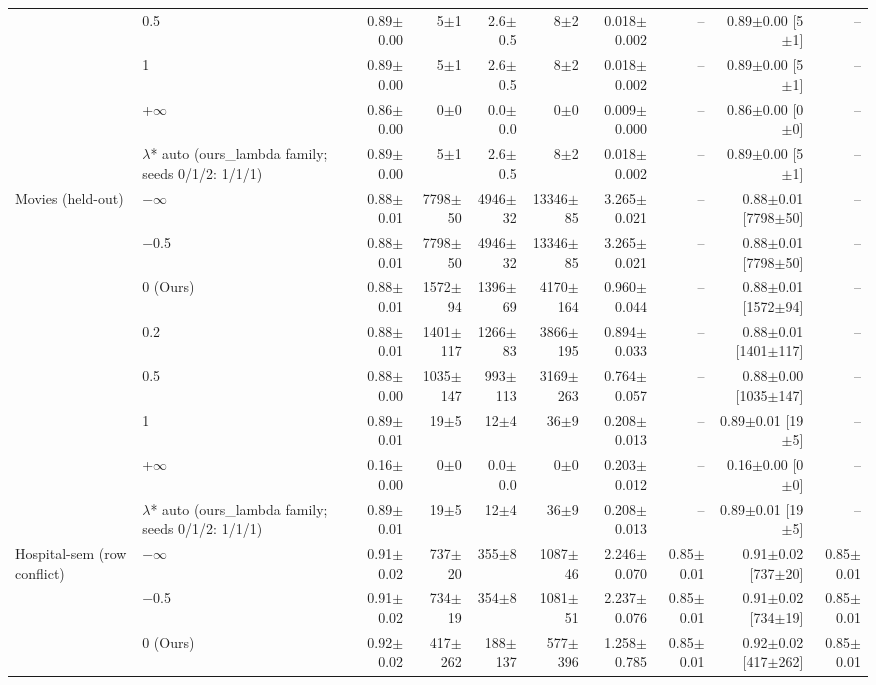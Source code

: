 {\begin{longtable}{llrrrrrrrr}
 & 0.5 & 0.89$\pm$0.00 & 5$\pm$1 & 2.6$\pm$0.5 & 8$\pm$2 & 0.018$\pm$0.002 & -- & 0.89$\pm$0.00 [5$\pm$1] & -- \\
 & 1 & 0.89$\pm$0.00 & 5$\pm$1 & 2.6$\pm$0.5 & 8$\pm$2 & 0.018$\pm$0.002 & -- & 0.89$\pm$0.00 [5$\pm$1] & -- \\
 & +$\infty$ & 0.86$\pm$0.00 & 0$\pm$0 & 0.0$\pm$0.0 & 0$\pm$0 & 0.009$\pm$0.000 & -- & 0.86$\pm$0.00 [0$\pm$0] & -- \\
 & $\lambda$* auto (ours\_lambda family; seeds 0/1/2: 1/1/1) & 0.89$\pm$0.00 & 5$\pm$1 & 2.6$\pm$0.5 & 8$\pm$2 & 0.018$\pm$0.002 & -- & 0.89$\pm$0.00 [5$\pm$1] & -- \\
\midrule
Movies (held-out) & $-$$\infty$ & 0.88$\pm$0.01 & 7798$\pm$50 & 4946$\pm$32 & 13346$\pm$85 & 3.265$\pm$0.021 & -- & 0.88$\pm$0.01 [7798$\pm$50] & -- \\
 & $-$0.5 & 0.88$\pm$0.01 & 7798$\pm$50 & 4946$\pm$32 & 13346$\pm$85 & 3.265$\pm$0.021 & -- & 0.88$\pm$0.01 [7798$\pm$50] & -- \\
 & 0 (Ours) & 0.88$\pm$0.01 & 1572$\pm$94 & 1396$\pm$69 & 4170$\pm$164 & 0.960$\pm$0.044 & -- & 0.88$\pm$0.01 [1572$\pm$94] & -- \\
 & 0.2 & 0.88$\pm$0.01 & 1401$\pm$117 & 1266$\pm$83 & 3866$\pm$195 & 0.894$\pm$0.033 & -- & 0.88$\pm$0.01 [1401$\pm$117] & -- \\
 & 0.5 & 0.88$\pm$0.00 & 1035$\pm$147 & 993$\pm$113 & 3169$\pm$263 & 0.764$\pm$0.057 & -- & 0.88$\pm$0.00 [1035$\pm$147] & -- \\
 & 1 & 0.89$\pm$0.01 & 19$\pm$5 & 12$\pm$4 & 36$\pm$9 & 0.208$\pm$0.013 & -- & 0.89$\pm$0.01 [19$\pm$5] & -- \\
 & +$\infty$ & 0.16$\pm$0.00 & 0$\pm$0 & 0.0$\pm$0.0 & 0$\pm$0 & 0.203$\pm$0.012 & -- & 0.16$\pm$0.00 [0$\pm$0] & -- \\
 & $\lambda$* auto (ours\_lambda family; seeds 0/1/2: 1/1/1) & 0.89$\pm$0.01 & 19$\pm$5 & 12$\pm$4 & 36$\pm$9 & 0.208$\pm$0.013 & -- & 0.89$\pm$0.01 [19$\pm$5] & -- \\
\midrule
Hospital-sem (row conflict) & $-$$\infty$ & 0.91$\pm$0.02 & 737$\pm$20 & 355$\pm$8 & 1087$\pm$46 & 2.246$\pm$0.070 & 0.85$\pm$0.01 & 0.91$\pm$0.02 [737$\pm$20] & 0.85$\pm$0.01 \\
 & $-$0.5 & 0.91$\pm$0.02 & 734$\pm$19 & 354$\pm$8 & 1081$\pm$51 & 2.237$\pm$0.076 & 0.85$\pm$0.01 & 0.91$\pm$0.02 [734$\pm$19] & 0.85$\pm$0.01 \\
 & 0 (Ours) & 0.92$\pm$0.02 & 417$\pm$262 & 188$\pm$137 & 577$\pm$396 & 1.258$\pm$0.785 & 0.85$\pm$0.01 & 0.92$\pm$0.02 [417$\pm$262] & 0.85$\pm$0.01 \\

\end{longtable}}
